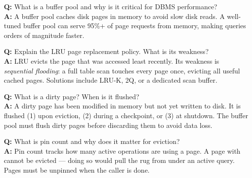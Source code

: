 \begin{interviewbox}
\textbf{Q:} What is a buffer pool and why is it critical for DBMS performance?\\[4pt]
\textbf{A:} A buffer pool caches disk pages in memory to avoid slow disk reads.  A well-tuned buffer pool can serve 95\%+ of page requests from memory, making queries orders of magnitude faster.

\vspace{6pt}
\textbf{Q:} Explain the LRU page replacement policy.  What is its weakness?\\[4pt]
\textbf{A:} LRU evicts the page that was accessed least recently.  Its weakness is \emph{sequential flooding}: a full table scan touches every page once, evicting all useful cached pages.  Solutions include LRU-K, 2Q, or a dedicated scan buffer.

\vspace{6pt}
\textbf{Q:} What is a dirty page?  When is it flushed?\\[4pt]
\textbf{A:} A dirty page has been modified in memory but not yet written to disk.  It is flushed (1) upon eviction, (2) during a checkpoint, or (3) at shutdown.  The buffer pool must flush dirty pages before discarding them to avoid data loss.

\vspace{6pt}
\textbf{Q:} What is pin count and why does it matter for eviction?\\[4pt]
\textbf{A:} Pin count tracks how many active operations are using a page.  A page with  cannot be evicted --- doing so would pull the rug from under an active query.  Pages must be unpinned when the caller is done.
\end{interviewbox}
